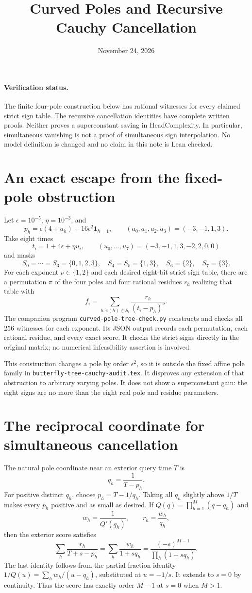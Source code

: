 \documentclass[11pt]{article}
\title{Curved Poles and Recursive Cauchy Cancellation}
\author{}
\date{November 24, 2026}
\begin{document}
\maketitle

\paragraph{Verification status.}
The finite four-pole construction below has rational witnesses for every
claimed strict sign table. The recursive cancellation identities have
complete written proofs. Neither proves a superconstant saving in
HeadComplexity. In particular, simultaneous vanishing is not a proof of
simultaneous sign interpolation. No model definition is changed and no
claim in this note is Lean checked.

\section{An exact escape from the fixed-pole obstruction}
Let $\epsilon=10^{-5}$, $\eta=10^{-3}$, and
\[
 p_h=\epsilon(4+a_h)+16\epsilon^2\mathbf1_{h=1},
 \qquad (a_0,a_1,a_2,a_3)=(-3,-1,1,3).
\]
Take eight times
\[
 t_i=1+4\epsilon+\eta u_i,
 \qquad (u_0,\ldots,u_7)=(-3,-1,1,3,-2,2,0,0)
\]
and masks
\[
 S_0=\cdots=S_3=\{0,1,2,3\},\quad
 S_4=S_5=\{1,3\},\quad S_6=\{2\},\quad S_7=\{3\}.
\]
For each exponent $\nu\in\{1,2\}$ and each desired eight-bit
strict sign table, there are a permutation $\pi$ of the four poles
and four rational residues $r_h$ realizing that table with
\[
 f_i=\sum_{h:\pi(h)\in S_i}\frac{r_h}{(t_i-p_h)^\nu}.
\]
The companion program \texttt{curved-pole-tree-check.py} constructs
and checks all $256$ witnesses for each exponent. Its JSON output
records each permutation, each rational residue, and every exact
score. It checks the strict signs directly in the original matrix;
no numerical infeasibility assertion is involved.

This construction changes a pole by order $\epsilon^2$, so it is
outside the fixed affine pole family in
\texttt{butterfly-tree-cauchy-audit.tex}. It disproves any extension
of that obstruction to arbitrary varying poles. It does not show a
superconstant gain: the eight signs are no more than the eight real
pole and residue parameters.

\section{The reciprocal coordinate for simultaneous cancellation}
The natural pole coordinate near an exterior query time $T$ is
\[
 q_h=\frac1{T-p_h}.
\]
For positive distinct $q_h$, choose $p_h=T-1/q_h$. Taking all $q_h$
slightly above $1/T$ makes every $p_h$ positive and as small as desired.
If $Q(q)=\prod_{h=1}^M(q-q_h)$ and
\[
 w_h=\frac1{Q'(q_h)},\qquad r_h=\frac{w_h}{q_h},
\]
then the exterior score satisfies
\[
 \sum_h\frac{r_h}{T+s-p_h}
 =\sum_h\frac{w_h}{1+s q_h}
 =\frac{(-s)^{M-1}}{\prod_h(1+s q_h)}.
 \tag{1}\label{eq:barycentric}
\]
The last identity follows from the partial fraction identity
$1/Q(u)=\sum_h w_h/(u-q_h)$, substituted at $u=-1/s$.
It extends to $s=0$ by continuity. Thus the score has exactly order
$M-1$ at $s=0$ when $M>1$.
\end{document}
